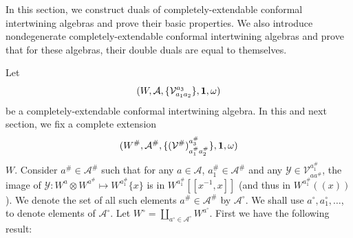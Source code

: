 \documentclass{amsproc}
\theoremstyle{definition}
\theoremstyle{remark}
\numberwithin{equation}{section}
\begin{document}
In this section, we  construct 
duals of completely-extendable conformal
intertwining algebras and prove their
basic properties. We also introduce nondegenerate 
completely-extendable conformal
intertwining algebras
and prove that for these algebras, their double duals
are equal to themselves.

Let 
$$(W, 
\mathcal{A}, \{\mathcal{V}_{a_{1}a_{2}}^{a_{3}}\}, {\bf 1}, 
\omega)$$
be a completely-extendable conformal intertwining algebra. In this 
and next section, we fix a complete extension
$$(W^{\#}, 
\mathcal{A}^{\#}, \{(\mathcal{V}^{\#})_{a^{\#}_{1}a^{\#}_{2}}
^{a^{\#}_{3}}\}, {\bf 1}, 
\omega)$$
$W$. 
Consider $a^{\#}\in \mathcal{A}^{\#}$
such that for any $a\in \mathcal{A}$, 
$a^{\#}_{1}\in \mathcal{A}^{\#}$ and
any $\mathcal{Y}\in \mathcal{
V}_{aa^{\#}}^{a^{\#}_{1}}$, the image of
$\mathcal{Y}: W^{a}\otimes W^{a^{\#}}\mapsto W^{a^{\#}_{1}}\{x\}$
is in $W^{a^{\#}_{1}}[[x^{-1}, x]]$ (and thus in $W^{a^{\#}_{1}}((x))$).
We denote the set of all such elements $a^{\#}\in \mathcal{A}^{\#}$
by $\mathcal{A}^{\circ}$. We shall use $a^{\circ}, a_{1}^{\circ}, \dots$,
to denote elements of $\mathcal{A}^{\circ}$.
Let 
$W^{\circ}=\coprod_{a^{\circ}\in \mathcal{A}^{\circ}}
W^{a^{\circ}}$. 
First we have the following result:
\end{document}
